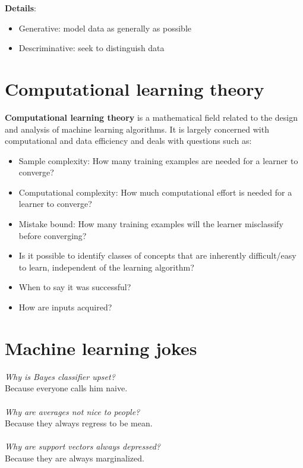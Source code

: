 \documentclass{report}
\begin{document}
{\bf Details}:
\begin{itemize}
  \item Generative: model data as generally as possible
  \item Descriminative: seek to distinguish data
\end{itemize}

\section{Computational learning theory}
{\bf Computational learning theory} is a mathematical field related to the design and analysis of machine learning algorithms.
It is largely concerned with computational and data efficiency and deals with questions such as:
\begin{itemize}
\item Sample complexity: How many training examples are needed for a learner to converge?
\item Computational complexity: How much computational effort is needed for a learner to converge?
\item Mistake bound: How many training examples will the learner misclassify before converging?
\item Is it possible to identify classes of concepts that are inherently difficult/easy to learn, independent of the learning algorithm?
\item When to say it was successful?
\item How are inputs acquired?
\end{itemize}

\section{Machine learning jokes}
{\em Why is Bayes classifier upset?} \\
Because everyone calls him naive.
\\
\\
{\em Why are averages not nice to people?} \\
Because they always regress to be mean.
\\
\\
{\em Why are support vectors always depressed?} \\
Because they are always marginalized.
\end{document}
